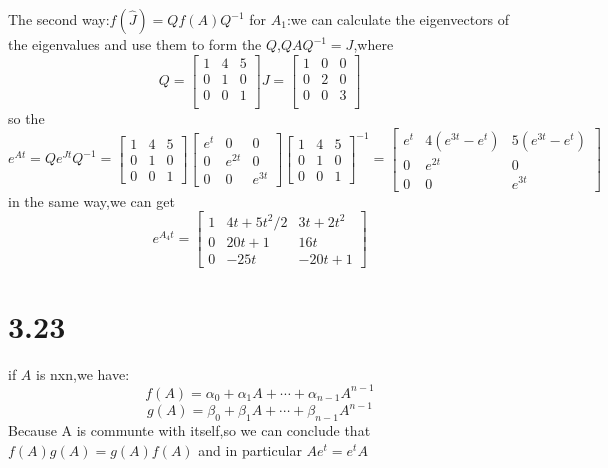 \documentclass{article}
\begin{document}
The second way:$f(\hat{J})=Qf(A)Q^{-1}$
for $A_1$:we can calculate the eigenvectors of the eigenvalues and use them to
form the $Q$,$QAQ^{-1}=J$,where
\[
Q=
\left[
\begin{array}{ccc}
1 & 4 & 5\\
0 & 1 & 0\\
0 & 0 &1\\   
\end{array}
\right]
J=
\left[
\begin{array}{ccc}
1 & 0 &0\\
0 & 2 & 0\\
0 & 0 &3\\
\end{array}
\right]
\]
so the 
\[e^{A t}=Q e^{J t} Q^{-1}
=
\left[\begin{array}{rrr}
1 & 4 & 5 \\
0 & 1 & 0 \\
0 & 0 & 1
\end{array}\right]\left[\begin{array}{ccc}
e^{t} & 0 & 0 \\
0 & e^{2 t} & 0 \\
0 & 0 & e^{3 t}
\end{array}\right]\left[\begin{array}{ccc}
1 & 4 & 5 \\
0 & 1 & 0 \\
0 & 0 & 1
\end{array}\right]^{-1}
=
\left[\begin{array}{ccc}
    e^{t} & 4\left(e^{3 t}-e^{t}\right) & 5\left(e^{3 t}-e^{t}\right) \\
    0 & e^{2 t} & 0 \\
    0 & 0 & e^{3 t}
    \end{array}\right]
\]
in the same way,we can get 
\[e^{A_4t}
=
\left[\begin{array}{ccc}
    1 & 4 t+5 t^{2} / 2 & 3 t+2 t^{2} \\
    0 & 20 t+1 & 16 t \\
    0 & -25 t & -20 t+1
    \end{array}\right]
\]

\section*{3.23}
if $A$ is nxn,we have:
\[f(A)=\alpha_0+\alpha_1A+\cdots+\alpha_{n-1}A^{n-1}\]
\[g(A)=\beta_0+\beta_1A+\cdots+\beta_{n-1}A^{n-1}\]
Because A is communte with itself,so we can conclude that$f(A)g(A)=g(A)f(A)$
and in particular $Ae^t=e^tA$
\end{document}
